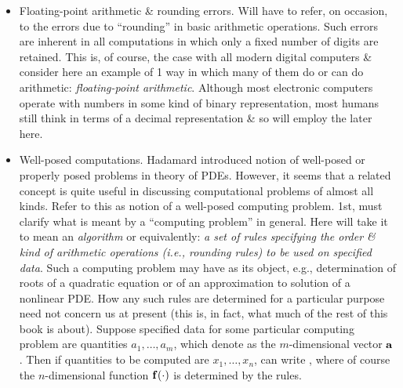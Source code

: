\documentclass{article}
\newtheorem{theorem}{Theorem}
\begin{document}
\begin{itemize}
\begin{itemize}
		\begin{theorem}
			For any square matrix $A$ of order $n$ there exists a nonsingular matrix $P$, of order $n$, s.t. $B = P^{-1}AP$ is upper triangular \& has the eigenvalues of $A$, say $\lambda_i\coloneqq\lambda_i(A)$, $i = 1,\ldots,n$, on the principal diagonal (i.e., any square matrix is equivalent to a triangular matrix).
		\end{theorem}
		\item {\sf Floating-point arithmetic \& rounding errors.} Will have to refer, on occasion, to the errors due to ``rounding'' in basic arithmetic operations. Such errors are inherent in all computations in which only a fixed number of digits are retained. This is, of course, the case with all modern digital computers \& consider here an example of 1 way in which many of them do or can do arithmetic: {\it floating-point arithmetic}. Although most electronic computers operate with numbers in some kind of binary representation, most humans still think in terms of a decimal representation \& so will employ the later here.
		\item {\sf Well-posed computations.} {\sc Hadamard} introduced notion of well-posed or properly posed problems in theory of PDEs. However, it seems that a related concept is quite useful in discussing computational problems of almost all kinds. Refer to this as notion of a well-posed computing problem. 1st, must clarify what is meant by a ``computing problem'' in general. Here will take it to mean an {\it algorithm} or equivalently: {\it a set of rules specifying the order \& kind of arithmetic operations (i.e., rounding rules) to be used on specified data}. Such a computing problem may have as its object, e.g., determination of roots of a quadratic equation or of an approximation to solution of a nonlinear PDE. How any such rules are determined for a particular purpose need not concern us at present (this is, in fact, what much of the rest of this book is about). Suppose specified data for some particular computing problem are quantities $a_1,\ldots,a_m$, which denote as the $m$-dimensional vector ${\bf a}$. Then if quantities to be computed are $x_1,\ldots,x_n$, can write , where of course the $n$-dimensional function ${\bf f}(\cdot)$ is determined by the rules.
		

\end{itemize}
\end{itemize}
\end{document}
